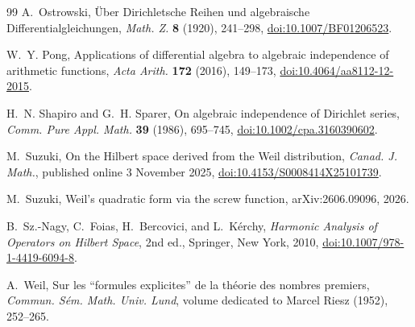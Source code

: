 \documentclass[11pt]{article}
\theoremstyle{definition}
\theoremstyle{remark}
\begin{document}
\begin{thebibliography}{99}
A.~Ostrowski,
\newblock \"Uber Dirichletsche Reihen und algebraische Differentialgleichungen,
\newblock \emph{Math. Z.} \textbf{8} (1920), 241--298,
\newblock \href{https://doi.org/10.1007/BF01206523}{doi:10.1007/BF01206523}.

W.~Y. Pong,
\newblock Applications of differential algebra to algebraic independence of arithmetic
functions,
\newblock \emph{Acta Arith.} \textbf{172} (2016), 149--173,
\newblock \href{https://doi.org/10.4064/aa8112-12-2015}{doi:10.4064/aa8112-12-2015}.

H.~N. Shapiro and G.~H. Sparer,
\newblock On algebraic independence of Dirichlet series,
\newblock \emph{Comm. Pure Appl. Math.} \textbf{39} (1986), 695--745,
\newblock \href{https://doi.org/10.1002/cpa.3160390602}
{doi:10.1002/cpa.3160390602}.

M.~Suzuki,
\newblock On the Hilbert space derived from the Weil distribution,
\newblock \emph{Canad. J. Math.}, published online 3 November 2025,
\newblock \href{https://doi.org/10.4153/S0008414X25101739}
{doi:10.4153/S0008414X25101739}.

M.~Suzuki,
\newblock Weil's quadratic form via the screw function,
\newblock arXiv:2606.09096, 2026.

B.~Sz.-Nagy, C.~Foias, H.~Bercovici, and L.~K\'erchy,
\newblock \emph{Harmonic Analysis of Operators on Hilbert Space}, 2nd ed.,
\newblock Springer, New York, 2010,
\newblock \href{https://doi.org/10.1007/978-1-4419-6094-8}
{doi:10.1007/978-1-4419-6094-8}.

A.~Weil,
\newblock Sur les ``formules explicites'' de la th\'eorie des nombres premiers,
\newblock \emph{Commun. S\'em. Math. Univ. Lund}, volume dedicated to Marcel Riesz
(1952), 252--265.

\end{thebibliography}
\end{document}
